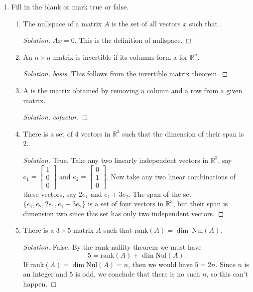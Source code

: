 \documentclass[11pt,letterpaper]{report}
\newcommand{\reals}{\mathbb{R}}
\newenvironment{solution}
{\begin{proof}[Solution]}
{\end{proof}}
\begin{document}
\begin{enumerate}
	\item Fill in the blank or mark true or false.
	\begin{enumerate}
		\item The nullspace of a matrix $A$ is the set of all vectors $x$ such that \underline{\hspace{1.5cm}}.
		\begin{solution}
			$Ax = 0$. This is the definition of nullspace.
		\end{solution}
		\item An $n\times n$ matrix is invertible if its columns form a \underline{\hspace{1.5cm}} for $\reals^n$.
		\begin{solution}
			\textit{basis}. This follows from the invertible matrix theorem.
		\end{solution}
		\item A \underline{\hspace{1.5cm}} is the matrix obtained by removing a column and a row from a given matrix.
		\begin{solution}
			\textit{cofactor}.
		\end{solution}
		\item There is a set of 4 vectors in $\reals^3$ such that the dimension of their span is 2.
		\begin{solution}
			True. Take any two linearly independent vectors in $\reals^3$, say $e_1 = \begin{bmatrix}
				1\\0\\0
			\end{bmatrix}$ and $e_2 = \begin{bmatrix}
				0\\1\\0
			\end{bmatrix}$. Now take any two linear combinations of these vectors, say $2e_1$ and $e_1 + 3e_2$. The span of the set $\{e_1, e_2, 2e_1, e_1+3e_2\}$ is a set of four vectors in $\reals^3$, but their span is dimension two since this set has only two independent vectors.
		\end{solution}

		\item There is a $3\times 5$ matrix $A$ such that $\text{rank}(A) = \dim\ \text{Nul}(A)$.
		\begin{solution}
			False. By the rank-nullity theorem we must have
			\[
			5 = \text{rank}(A) + \dim\text{Nul}(A).
			\]
			If $\text{rank}(A) = \dim\text{Nul}(A) = n$, then we would have $5 = 2n$. Since $n$ is an integer and $5$ is odd, we conclude that there is no such $n$, so this can't happen.
		\end{solution}


\end{enumerate}
\end{enumerate}
\end{document}

